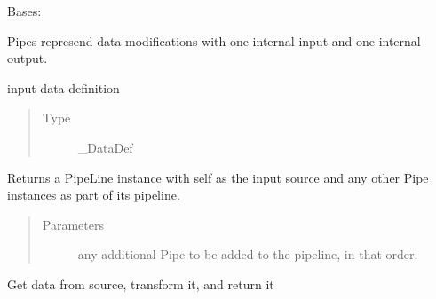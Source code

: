 \documentclass[letterpaper,10pt,english]{sphinxmanual}
\begin{document}
\begin{fulllineitems}
\label{\detokenize{dalio.pipe:dalio.pipe.pipe.Pipe}}
Bases: 

Pipes represend data modifications with one internal input and one
internal output.

\begin{fulllineitems}
\label{\detokenize{dalio.pipe:dalio.pipe.pipe.Pipe._source}}
input data definition
\begin{quote}\begin{description}
\item[{Type}] \leavevmode
\_DataDef

\end{description}\end{quote}

\end{fulllineitems}


\begin{fulllineitems}
\label{\detokenize{dalio.pipe:dalio.pipe.pipe.Pipe.pipeline}}
Returns a PipeLine instance with self as the input source and any
other Pipe instances as part of its pipeline.
\begin{quote}\begin{description}
\item[{Parameters}] \leavevmode
{} \textendash{} any additional Pipe to be added to the pipeline, in that
order.

\end{description}\end{quote}

\end{fulllineitems}


\begin{fulllineitems}
\label{\detokenize{dalio.pipe:dalio.pipe.pipe.Pipe.run}}
Get data from source, transform it, and return it


\end{fulllineitems}
\end{fulllineitems}
\end{document}

